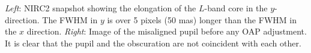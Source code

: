 \textit{Left}: NIRC2 snapshot showing the elongation of the $L$-band core in the $y$-direction. The FWHM in $y$ is over 5 pixels (50 mas) longer than the FWHM in the $x$ direction. \textit{Right}: Image of the misaligned pupil before any OAP adjustment. It is clear that the pupil and the obscuration are not coincident with each other.
  